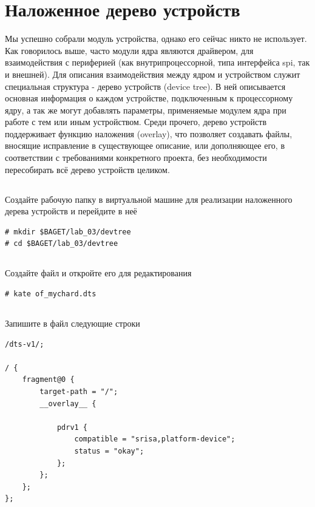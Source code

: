 \section{Наложенное дерево устройств}
Мы успешно собрали модуль устройства, однако его сейчас никто не использует. Как говорилось выше, часто модули ядра являются драйвером, для взаимодействия с периферией (как внутрипроцессорной, типа интерфейса spi, так и внешней). Для описания взаимодействия между ядром и устройством служит специальная структура - дерево устройств (device tree). В ней описывается основная информация о каждом устройстве, подключенным к процессорному ядру, а так же могут добавлять параметры, применяемые модулем ядра при работе с тем или иным устройством. Среди прочего, дерево устройств поддерживает функцию наложения (overlay), что позволяет создавать файлы, вносящие исправление в существующее описание, или дополняющее его, в соответствии с требованиями конкретного проекта, без необходимости пересобирать всё дерево устройств целиком.

\subsection{} Создайте рабочую папку в виртуальной машине для реализации наложенного дерева устройств и перейдите в неё
\begin{lstlisting}[style=bash]
# mkdir $BAGET/lab_03/devtree
# cd $BAGET/lab_03/devtree 
\end{lstlisting}

\subsection{} Создайте файл и откройте его для редактирования
\begin{lstlisting}[style=bash]
# kate of_mychard.dts
\end{lstlisting}

\subsection{}Запишите в файл следующие строки
\begin{lstlisting}[style=stdout]
/dts-v1/;

/ {
	fragment@0 {
		target-path = "/";
		__overlay__ {
			
			pdrv1 {
				compatible = "srisa,platform-device";
				status = "okay";
			};
		};
	};
};
\end{lstlisting}

